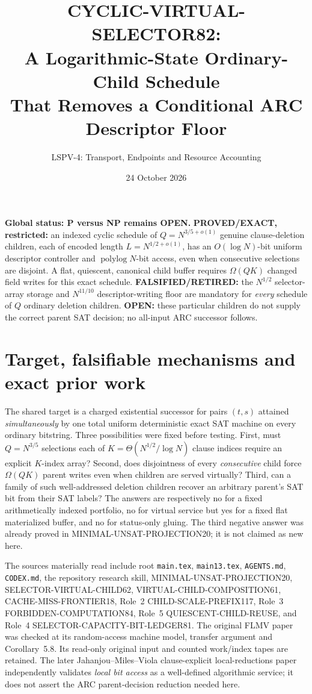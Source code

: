 \documentclass[11pt]{article}
\title{CYCLIC-VIRTUAL-SELECTOR82:\\
A Logarithmic-State Ordinary-Child Schedule\\
That Removes a Conditional ARC Descriptor Floor}
\author{LSPV-4: Transport, Endpoints and Resource Accounting}
\date{24 October 2026}
\newcommand{\polylog}{\operatorname{polylog}}
\begin{document}
\maketitle
\noindent\textbf{Global status: P versus NP remains OPEN.}
\textbf{PROVED/EXACT, restricted:} an indexed cyclic schedule of
$Q=N^{3/5+o(1)}$ genuine clause-deletion children, each of encoded
length $L=N^{1/2+o(1)}$, has an $O(\log N)$-bit uniform descriptor
controller and $\polylog N$-bit access, even when consecutive selections
are disjoint. A flat, quiescent, canonical child buffer requires
$\Omega(QK)$ changed field writes for this exact schedule.
\textbf{FALSIFIED/RETIRED:} the $N^{1/2}$ selector-array storage
and $N^{11/10}$ descriptor-writing floor are mandatory for
\emph{every} schedule of $Q$ ordinary deletion children.
\textbf{OPEN:} these particular children do not supply the correct
parent SAT decision; no all-input ARC successor follows.

\section{Target, falsifiable mechanisms and exact prior work}
The shared target is a charged existential successor for pairs
$(t,s)$ attained \emph{simultaneously} by one total uniform
deterministic exact SAT machine on every ordinary bitstring.
Three possibilities were fixed before testing.
First, must $Q=N^{3/5}$ selections each of $K=\Theta(N^{1/2}/\log N)$
clause indices require an explicit $K$-index array?
Second, does disjointness of every \emph{consecutive} child force
$\Omega(QK)$ parent writes even when children are served virtually?
Third, can a family of such well-addressed deletion children
recover an arbitrary parent's SAT bit from their SAT labels?
The answers are respectively no for a fixed arithmetically indexed
portfolio, no for virtual service but yes for a fixed flat materialized
buffer, and no for status-only gluing. The third negative answer was
already proved in MINIMAL-UNSAT-PROJECTION20; it is not claimed
as new here.

The sources materially read include root \texttt{main.tex},
\texttt{main13.tex}, \texttt{AGENTS.md}, \texttt{CODEX.md},
the repository research skill, MINIMAL-UNSAT-PROJECTION20,
SELECTOR-VIRTUAL-CHILD62, VIRTUAL-CHILD-COMPOSITION61,
CACHE-MISS-FRONTIER18, Role~2 CHILD-SCALE-PREFIX117,
Role~3 FORBIDDEN-COMPUTATION84, Role~5
QUIESCENT-CHILD-REUSE, and Role~4 SELECTOR-CAPACITY-BIT-LEDGER81.
The original FLMV paper was checked at its random-access machine
model, transfer argument and Corollary~5.8. Its read-only original
input and counted work/index tapes are retained.
The later Jahanjou--Miles--Viola clause-explicit local-reductions
paper independently validates \emph{local bit access} as a
well-defined algorithmic service; it does not assert the ARC
parent-decision reduction needed here.
\end{document}
